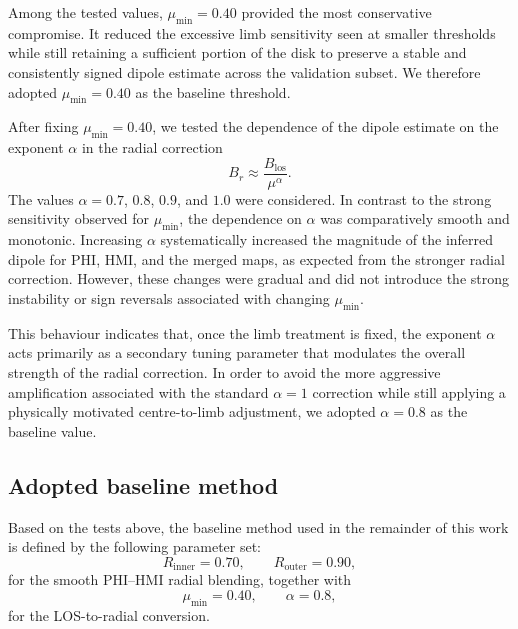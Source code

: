 \documentclass[namedreferences,hyperref,optionalrh]{spr-sola}
\begin{document}
Among the tested values, $\mu_{\min}=0.40$ provided the most conservative compromise. It reduced the excessive limb sensitivity seen at smaller thresholds while still retaining a sufficient portion of the disk to preserve a stable and consistently signed dipole estimate across the validation subset. We therefore adopted $\mu_{\min}=0.40$ as the baseline threshold.


After fixing $\mu_{\min}=0.40$, we tested the dependence of the dipole estimate on the exponent $\alpha$ in the radial correction
\begin{equation}
    B_r \approx \frac{B_{\mathrm{los}}}{\mu^\alpha}.
\end{equation}
The values $\alpha=0.7$, $0.8$, $0.9$, and $1.0$ were considered. In contrast to the strong sensitivity observed for $\mu_{\min}$, the dependence on $\alpha$ was comparatively smooth and monotonic. Increasing $\alpha$ systematically increased the magnitude of the inferred dipole for PHI, HMI, and the merged maps, as expected from the stronger radial correction. However, these changes were gradual and did not introduce the strong instability or sign reversals associated with changing $\mu_{\min}$.

This behaviour indicates that, once the limb treatment is fixed, the exponent $\alpha$ acts primarily as a secondary tuning parameter that modulates the overall strength of the radial correction. In order to avoid the more aggressive amplification associated with the standard $\alpha=1$ correction while still applying a physically motivated centre-to-limb adjustment, we adopted $\alpha=0.8$ as the baseline value.

\subsection{Adopted baseline method}

Based on the tests above, the baseline method used in the remainder of this work is defined by the following parameter set:
\begin{equation}
    R_{\mathrm{inner}}=0.70,\qquad
    R_{\mathrm{outer}}=0.90,
\end{equation}
for the smooth PHI--HMI radial blending, together with
\begin{equation}
    \mu_{\min}=0.40,\qquad
    \alpha=0.8,
\end{equation}
for the LOS-to-radial conversion.
\end{document}
